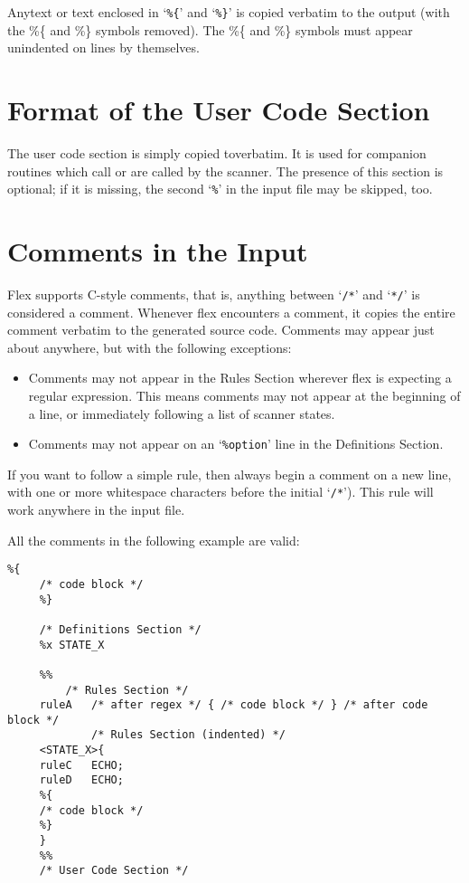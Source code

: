 \documentclass[openany,oneside]{book}
\begin{document}
Anytext or text enclosed in ‘\verb`%{`’ and ‘\verb`%}`’
is copied verbatim to the output (with the \%{}\{{} and \%{}\}{} symbols removed). 
The \%{}\{{} and \%{}\}{} symbols must appear unindented on lines by themselves.
\section{Format of the User Code Section}


The user code section is simply copied toverbatim.  It
is used for companion routines which call or are called by the scanner. 
The presence of this section is optional; if it is missing, the second
‘\verb`%`’ in the input file may be skipped, too.
\section{Comments in the Input}


Flex supports C-style comments, that is, anything between ‘\verb`/*`’ and
‘\verb`*/`’ is
considered a comment. Whenever flex encounters a comment, it copies the
entire comment verbatim to the generated source code. Comments may
appear just about anywhere, but with the following exceptions:
\begin{itemize}
\item Comments may not appear in the Rules Section wherever flex is expecting
a regular expression. This means comments may not appear at the
beginning of a line, or immediately following a list of scanner states.
\item Comments may not appear on an ‘\verb`%option`’ line in the Definitions
Section.
\end{itemize}


If you want to follow a simple rule, then always begin a comment on a
new line, with one or more whitespace characters before the initial
‘\verb`/*`’).  This rule will work anywhere in the input file.

All the comments in the following example are valid:


\begin{verbatim}
%{
     /* code block */
     %}
     
     /* Definitions Section */
     %x STATE_X
     
     %%
         /* Rules Section */
     ruleA   /* after regex */ { /* code block */ } /* after code block */
             /* Rules Section (indented) */
     <STATE_X>{
     ruleC   ECHO;
     ruleD   ECHO;
     %{
     /* code block */
     %}
     }
     %%
     /* User Code Section */
\end{verbatim}
\end{document}
